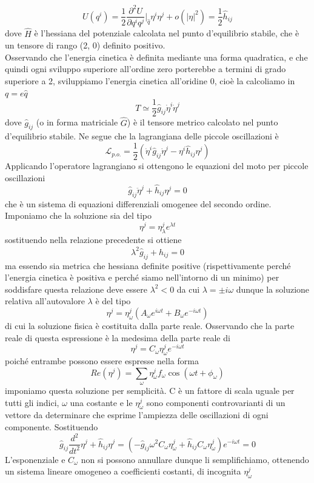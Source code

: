\documentclass[
10pt, %
a4paper, %
oneside, %
headinclude,footinclude, %
BCOR5mm, %
]{scrartcl}
\begin{document}
\[U(q^i) = \frac{1}{2} \frac{\partial^2 U}{\partial q^iq^j}|_{\hat{q}}\eta^i\eta^j+o(|\eta|^2) = \frac{1}{2}\hat{h}_{ij}\]
dove \(\hat{H}\) è l'hessiana del potenziale calcolata nel punto d'equilibrio stabile, che è un tensore di rango (2, 0) definito positivo.\\
Osservando che l'energia cinetica è definita mediante una forma quadratica, e che quindi ogni sviluppo superiore all'ordine zero porterebbe a termini di grado superiore a 2, sviluppiamo l'energia cinetica all'oridine 0, cioè la calcoliamo in $q = e\hat{q}$
\[T \simeq \frac{1}{2}\hat{g}_{ij}\dot{\eta}^i\dot{\eta}^j\]
dove \(\hat{g}_{ij}\) (o in forma matriciale \(\hat{G}\)) è il tensore metrico calcolato nel punto d'equilibrio stabile. Ne segue che la lagrangiana delle piccole oscillazioni è 
\[\mathcal{L}_{p.o.} = \frac{1}{2}\left(\dot{\eta}^i\hat{g}_{ij}\dot{\eta}^j-\eta^i\hat{h}_{ij}\eta^j\right)\]
Applicando l'operatore lagrangiano si ottengono le equazioni del moto per piccole oscillazioni
\[\hat{g}_{ij}\ddot{\eta}^j+\hat{h}_{ij}\eta^j = 0\]
che è un sistema di equazioni differenziali omogenee del secondo ordine.
Imponiamo che la soluzione sia del tipo
\[\eta^j = \eta_\lambda^j e^{\lambda t}\]
sostituendo nella relazione precedente si ottiene
\[\lambda^2\hat{g}_{ij}+\hat{h}_{ij} = 0\]
ma essendo sia metrica che hessiana definite positive (rispettivamente perché l'energia cinetica è positiva e perché siamo nell'intorno di un minimo) per soddisfare questa relazione deve essere \(\lambda^2<0\) da cui $\lambda = \pm i\omega$ dunque la soluzione relativa all'autovalore $\lambda$ è del tipo
\[\eta^j = \eta_\omega^j\left(A_{\omega}e^{i\omega t} + B_{\omega}e^{-i\omega t}\right)\]
di cui la soluzione fisica è costituita dalla parte reale. Osservando che la parte reale di questa espressione è la medesima della parte reale di
\[\eta^j = C_{\omega}\eta_{\omega}^je^{-i\omega t}\]
poiché entrambe possono essere espresse nella forma
\[Re(\eta^j) = \sum_\omega \eta_\omega^jf_\omega\cos(\omega t + \phi_\omega)\]
imponiamo questa soluzione per semplicità. C è un fattore di scala uguale per tutti gli indici, $\omega$ una costante e le \(\eta_{\omega}^j\) sono componenti controvarianti di un vettore da determinare che esprime l'ampiezza delle oscillazioni di ogni componente. Sostituendo
\[\hat{g}_{ij}\frac{d^2}{dt^2}{\eta}^j+\hat{h}_{ij}\eta^j= \left(-\hat{g}_{ij}\omega^2C_{\omega}\eta_{\omega}^j+\hat{h}_{ij}C_{\omega}\eta_{\omega}^j\right)e^{-i\omega t} = 0\]
L'esponenziale e \(C_{\omega}\) non si possono annullare dunque li semplifichiamo, ottenendo un sistema lineare omogeneo a coefficienti costanti, di incognita \(\eta_{\omega}^j\)
\end{document}
